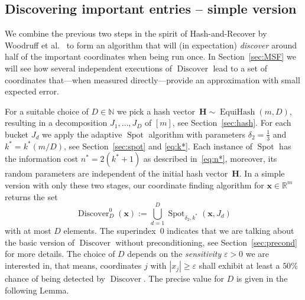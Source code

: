 \documentclass[12pt]{article}
\theoremstyle{plain}
\theoremstyle{definition}
\DeclareMathOperator{\EquiHash}{EquiHash}
\newcommand{\eps}{\varepsilon}
\renewcommand{\vec}{\boldsymbol}
\newcommand{\R}{{\mathbb R}}
\newcommand{\N}{{\mathbb N}}
\DeclareMathOperator{\spot}{Spot}
\DeclareMathOperator{\discover}{Discover} %
\begin{document}
\subsection{Discovering important entries -- simple version}
\label{sec:discover}

We combine the previous two steps in the spirit of Hash-and-Recover by Woodruff et al.~\cite[Sec~E.2.2]{LNW17}
to form an algorithm that will (in expectation)
\emph{discover} around half 
of the important coordinates when being run once.
In Section~\ref{sec:MSF} we will see how several independent executions of $\discover$ lead to a set of coordinates that---when measured directly---provide an approximation with small expected error.

For a suitable choice of $D \in \N$ 
we pick a hash vector~$\vec{H} \sim \EquiHash(m,D)$,
resulting in a decomposition $J_1,\ldots,J_D$ of $[m]$, see Section~\ref{sec:hash}. 
For each bucket $J_d$ we apply the adaptive $\spot$ algorithm 
with parameters $\delta_2 = \frac{1}{3}$
and \mbox{$k^\ast = k^\ast(m/D)$}, see Section~\ref{sec:spot} and \eqref{eq:k*}.
Each instance of $\spot$ has the information cost \mbox{$n^\ast = 2(k^\ast+1)$} as described in~\eqref{eq:n*},
moreover, its random parameters are independent of the initial hash vector~$\vec{H}$.
In a simple version with only these two stages, our coordinate finding
algorithm for $\vec{x} \in \R^m$ returns the set
\begin{equation} \label{eq:Discover0}
    \discover_D^0(\vec{x}) := \bigcup_{d = 1}^{D} \spot_{\delta_2,k^\ast}(\vec{x},J_d)
\end{equation}
with at most $D$ elements.
The superindex~$0$ indicates that we are talking about the basic version of $\discover$ without preconditioning, see Section~\ref{sec:precond} for more details.
The choice of $D$ depends on the \emph{sensitivity} $\eps > 0$ we are interested in,
that means, coordinates $j$ with $|x_j| \geq \eps$ shall exhibit at least a $50\%$ chance of being detected by $\discover$. The precise value for $D$ is given in the following Lemma.
\end{document}
